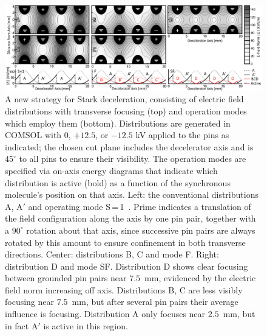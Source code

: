 \documentclass[%
 reprint,
 amsmath,amssymb,
 aps,
prl,
]{revtex4-1}
\begin{document}
\begin{figure}[t!]
\includegraphics[width=\linewidth]{Configurations/pinpairformal5.png}%
\vspace{-2mm}
\caption{
A new strategy for Stark deceleration, consisting of electric field distributions with transverse focusing (top) and operation modes which employ them (bottom). 
Distributions are generated in COMSOL with $0$, $+12.5$, or $-12.5$ kV applied to the pins as indicated; the chosen cut plane includes the decelerator axis and is $45^\circ$ to all pins to ensure their visibility.
The operation modes are specified via on-axis energy diagrams that indicate which distribution is active (bold) as a function of the synchronous molecule's position on that axis.
Left: the conventional distributions A, A$'$ and operating mode S\,=\,1~\cite{VanDeMeerakker2005a}.
Prime indicates a translation of the field configuration along the axis by one pin pair, together with a $90^\circ$ rotation about that axis, since successive pin pairs are always rotated by this amount to ensure confinement in both transverse directions.
Center: distributions B, C and mode F.
Right: distribution D and mode SF.
Distribution D shows clear focusing between grounded pin pairs near $7.5$~mm, evidenced by the electric field norm increasing off axis.
Distributions B, C are less visibly focusing near $7.5$~mm, but after several pin pairs their average influence is focusing.
Distribution A only focuses near $2.5$~mm, but in fact A$'$ is active in this region.
\vspace{-4mm}
}
\label{fig:chargecartoon}
\end{figure}
\end{document}
